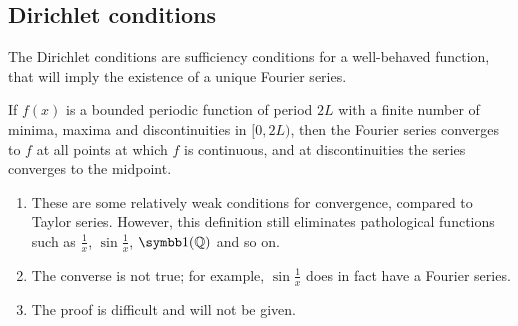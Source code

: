 \subsection{Dirichlet conditions}
The Dirichlet conditions are sufficiency conditions for a well-behaved function, that will imply the existence of a unique Fourier series.
\begin{theorem}
	If \( f(x) \) is a bounded periodic function of period \( 2L \) with a finite number of minima, maxima and discontinuities in \( [0, 2L) \), then the Fourier series converges to \( f \) at all points at which \( f \) is continuous, and at discontinuities the series converges to the midpoint.
\end{theorem}
\begin{remark}
	\begin{enumerate}
		\item These are some relatively weak conditions for convergence, compared to Taylor series.
		      However, this definition still eliminates pathological functions such as \( \frac{1}{x} \), \( \sin \frac{1}{x} \), \( \symbb 1 (\mathbb Q) \) and so on.
		\item The converse is not true; for example, \( \sin \frac{1}{x} \) does in fact have a Fourier series.
		\item The proof is difficult and will not be given.
	\end{enumerate}
\end{remark}

